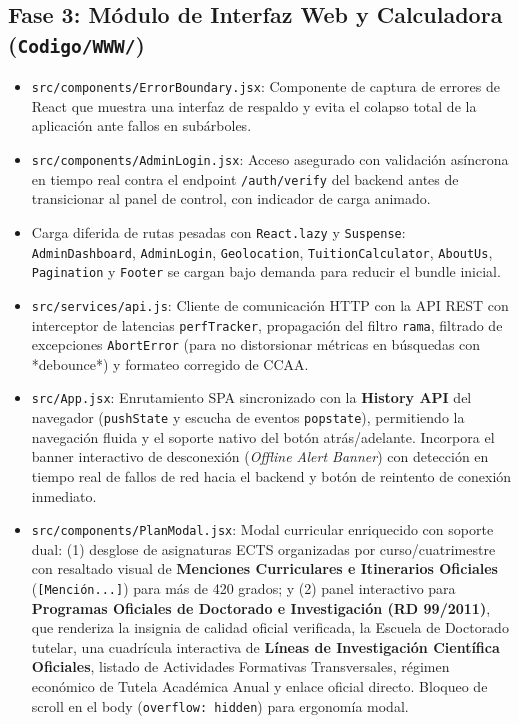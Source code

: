 \subsection{Fase 3: Módulo de Interfaz Web y Calculadora (\texttt{Codigo/WWW/})}
\begin{itemize}
    \item \texttt{src/components/ErrorBoundary.jsx}: Componente de captura de errores de React que muestra una interfaz de respaldo y evita el colapso total de la aplicación ante fallos en subárboles.
    \item \texttt{src/components/AdminLogin.jsx}: Acceso asegurado con validación asíncrona en tiempo real contra el endpoint \texttt{/auth/verify} del backend antes de transicionar al panel de control, con indicador de carga animado.
    \item Carga diferida de rutas pesadas con \texttt{React.lazy} y \texttt{Suspense}: \texttt{AdminDashboard}, \texttt{AdminLogin}, \texttt{Geolocation}, \texttt{TuitionCalculator}, \texttt{AboutUs}, \texttt{Pagination} y \texttt{Footer} se cargan bajo demanda para reducir el bundle inicial.
    \item \texttt{src/services/api.js}: Cliente de comunicación HTTP con la API REST con interceptor de latencias \texttt{perfTracker}, propagación del filtro \texttt{rama}, filtrado de excepciones \texttt{AbortError} (para no distorsionar métricas en búsquedas con *debounce*) y formateo corregido de CCAA.
    \item \texttt{src/App.jsx}: Enrutamiento SPA sincronizado con la \textbf{History API} del navegador (\texttt{pushState} y escucha de eventos \texttt{popstate}), permitiendo la navegación fluida y el soporte nativo del botón atrás/adelante. Incorpora el banner interactivo de desconexión (\emph{Offline Alert Banner}) con detección en tiempo real de fallos de red hacia el backend y botón de reintento de conexión inmediato.
    \item \texttt{src/components/PlanModal.jsx}: Modal curricular enriquecido con soporte dual: (1) desglose de asignaturas ECTS organizadas por curso/cuatrimestre con resaltado visual de \textbf{Menciones Curriculares e Itinerarios Oficiales} (\texttt{[Menci\'on...]}) para más de 420 grados; y (2) panel interactivo para \textbf{Programas Oficiales de Doctorado e Investigación (RD 99/2011)}, que renderiza la insignia de calidad oficial verificada, la Escuela de Doctorado tutelar, una cuadrícula interactiva de \textbf{Líneas de Investigación Científica Oficiales}, listado de Actividades Formativas Transversales, régimen económico de Tutela Académica Anual y enlace oficial directo. Bloqueo de scroll en el body (\texttt{overflow: hidden}) para ergonomía modal.

\end{itemize}
